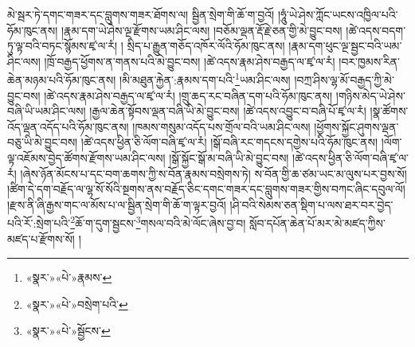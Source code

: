 མེ་སྦར་ཏེ་དགང་གཟར་དང་བླུགས་གཟར་ཐོགས་ལ། སྦྱིན་སྲེག་གི་ཆོ་ག་བྱའོ། །ཧཱུཾ་ཡེ་ཤེས་ཀློང་ཡངས་འཁྱིལ་པའི་ཧོམ་ཁུང་ནས། །རྣམ་དག་ཡེ་ཤེས་ལྔ་རྫོགས་ཡམ་ཤིང་ལས། །བཅོམ་ལྡན་རྡོ་རྗེ་ཅན་གྱི་མེ་བྱུང་བས། །ཚེ་འདས་བདག་ཏུ་ལྟ་བའི་བཏང་སྙོམས་ཛྭ་ལ་རཾ། །
སྲིད་པ་རྒྱུན་གཅོད་འཁོར་ལོའི་ཧོམ་ཁུང་ནས། །རྣམ་དག་ཕུང་ལྔ་སྦྱང་བའི་ཡམ་ཤིང་ལས། །ཁྲོ་བརྒྱད་ཕྱོགས་ན་གནས་པའི་མེ་བྱུང་བས། །ཚེ་འདས་རྣམ་ཤེས་བརྒྱད་ལ་ཛྭ་ལ་རཾ། །བར་ཁྱམས་རིན་ཆེན་མཉམ་པའི་ཧོམ་ཁུང་ནས། །མི་མཐུན་རྐྱེན་:རྣམས་དག་པའི་\footnote{«སྣར་»«པེ་»རྣམས་}ཡམ་ཤིང་ལས། །བཀྲ་ཤིས་ལྷ་མོ་བརྒྱད་ཀྱི་མེ་བྱུང་བས། །ཚེ་འདས་རྣམ་ཤེས་བརྒྱད་ལ་ཛྭ་ལ་རཾ། །གྲུ་ཆད་རང་བཞིན་དག་པའི་ཧོམ་ཁུང་ནས། །གཉིས་མེད་ཡེ་ཤེས་བཞི་ཡི་ཡམ་ཤིང་ལས། །རྒྱལ་ཆེན་སྟོབས་ལྡན་བཞི་ཡི་མེ་བྱུང་བས། །ཚེ་འདས་འབྱུང་བ་བཞི་པོ་ཛྭ་ལ་རཾ། །སྣ་ཚོགས་འོད་ལྡན་འདོད་པའི་ཧོམ་ཁུང་ནས། །ཁམས་གསུམ་འདོད་པས་གྲོལ་བའི་ཡམ་ཤིང་ལས། །ཕྱོགས་སྐྱོང་ཤུགས་ལྡན་བཅུ་ཡི་མེ་བྱུང་བས། །ཚེ་འདས་ཕྱིན་ཅི་ལོག་བཞི་ཛྭ་ལ་རཾ། །སྒོ་བཞི་རང་གདངས་དགྱེས་པའི་ཧོམ་ཁུང་ནས། །ལོག་ལྟ་འཇོམས་བྱེད་ཚོགས་རྫོགས་ཡམ་ཤིང་ལས། །སྒོ་སྐྱོང་སྒོ་མ་བཞི་ཡི་མེ་བྱུང་བས། །ཚེ་འདས་ཕྱིན་ཅི་ལོག་བཞི་ཛྭ་ལ་རཾ། །ཞེས་ཉོན་མོངས་པ་དང་བག་ཆགས་ཀྱི་ས་བོན་རྣམས་བསྲེགས་ཏེ། ས་བོན་གྱི་ཆ་ཙམ་ཡང་མ་ལུས་པར་བྱས་སོ། །ཚིག་དེ་དག་བརྗོད་ལ་ལྷ་སོ་སོའི་སྔགས་ནས་བརྗོད་ཅིང་དགང་གཟར་དང་བླུགས་གཟར་གྱིས་བཀང་ཞིང་དབུལ་ལོ། །རྫས་ནི་ཞི་རྒྱས་གང་ལ་མོས་པ་ལ་སྦྱིན་སྲེག་གི་ཆོ་ག་ལྟར་བྱའོ། །ཤི་བའི་སེམས་ཅན་སྡིག་པ་ལས་ཐར་བར་བྱེད་པའི་རོ་:སྲེག་པའི་\footnote{«སྣར་»«པེ་»བསྲེག་པའི་}ཆོ་ག་དུག་སྦྱངས་\footnote{«སྣར་»«པེ་»སྦྱོངས་}གསལ་བའི་མེ་ལོང་ཞེས་བྱ་བ། སློབ་དཔོན་ཆེན་པོ་མར་མེ་མཛད་ཀྱིས་མཛད་པ་རྫོགས་སོ། ། 